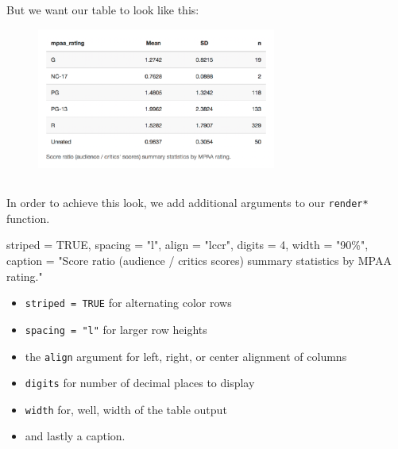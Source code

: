 \documentclass[
  letterpaper,
  DIV=11,
  numbers=noendperiod]{scrreprt}
\newenvironment{Shaded}{\begin{snugshade}}{\end{snugshade}}
\newcommand{\ConstantTok}[1]{\textcolor[rgb]{0.56,0.35,0.01}{#1}}
\newcommand{\DecValTok}[1]{\textcolor[rgb]{0.68,0.00,0.00}{#1}}
\newcommand{\NormalTok}[1]{\textcolor[rgb]{0.00,0.46,0.62}{#1}}
\newcommand{\OtherTok}[1]{\textcolor[rgb]{0.00,0.46,0.62}{#1}}
\newcommand{\StringTok}[1]{\textcolor[rgb]{0.13,0.47,0.30}{#1}}
\providecommand{\tightlist}{%
  \setlength{\itemsep}{0pt}\setlength{\parskip}{0pt}}
\begin{document}
But we want our table to look like this:

\begin{figure}

{\centering \includegraphics[width=0.7\textwidth,height=\textheight]{./images/summary-table-styled.png}

}

\end{figure}

\hypertarget{section-41}{%
\subsection{}\label{section-41}}

In order to achieve this look, we add additional arguments to our
\texttt{render*} function.

\begin{Shaded}
\begin{Highlighting}[]
\NormalTok{striped }\OtherTok{=} \ConstantTok{TRUE}\NormalTok{, spacing }\OtherTok{=} \StringTok{"l"}\NormalTok{, align }\OtherTok{=} \StringTok{"lccr"}\NormalTok{, digits }\OtherTok{=} \DecValTok{4}\NormalTok{, width }\OtherTok{=} \StringTok{"90\%"}\NormalTok{,}
\NormalTok{caption }\OtherTok{=} \StringTok{"Score ratio (audience / critics\textquotesingle{} scores) summary statistics by MPAA rating."}
\end{Highlighting}
\end{Shaded}

\begin{itemize}
\tightlist
\item
  \texttt{striped\ =\ TRUE} for alternating color rows
\item
  \texttt{spacing\ =\ "l"} for larger row heights
\item
  the \texttt{align} argument for left, right, or center alignment of
  columns
\item
  \texttt{digits} for number of decimal places to display
\item
  \texttt{width} for, well, width of the table output
\item
  and lastly a caption.
\end{itemize}
\end{document}
